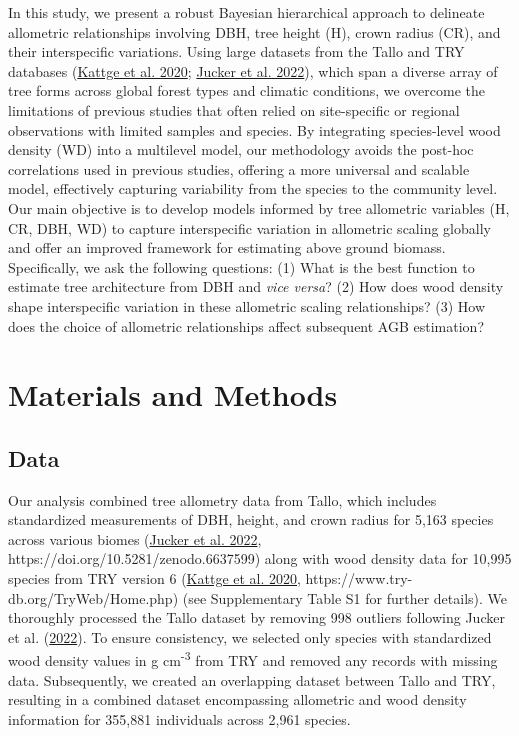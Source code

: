 \documentclass[
  12pt,
  letterpaper,
  DIV=11,
  numbers=noendperiod]{scrartcl}
\begin{document}
In this study, we present a robust Bayesian hierarchical approach to
delineate allometric relationships involving DBH, tree height (H), crown
radius (CR), and their interspecific variations. Using large datasets
from the Tallo and TRY databases
(\protect\hyperlink{ref-Kattge2020}{Kattge et al. 2020};
\protect\hyperlink{ref-Jucker2022}{Jucker et al. 2022}), which span a
diverse array of tree forms across global forest types and climatic
conditions, we overcome the limitations of previous studies that often
relied on site-specific or regional observations with limited samples
and species. By integrating species-level wood density (WD) into a
multilevel model, our methodology avoids the post-hoc correlations used
in previous studies, offering a more universal and scalable model,
effectively capturing variability from the species to the community
level. Our main objective is to develop models informed by tree
allometric variables (H, CR, DBH, WD) to capture interspecific variation
in allometric scaling globally and offer an improved framework for
estimating above ground biomass. Specifically, we ask the following
questions: (1) What is the best function to estimate tree architecture
from DBH and \emph{vice versa}? (2) How does wood density shape
interspecific variation in these allometric scaling relationships? (3)
How does the choice of allometric relationships affect subsequent AGB
estimation?

\hypertarget{materials-and-methods}{%
\section{Materials and Methods}\label{materials-and-methods}}

\hypertarget{data}{%
\subsection{Data}\label{data}}

Our analysis combined tree allometry data from Tallo, which includes
standardized measurements of DBH, height, and crown radius for 5,163
species across various biomes (\protect\hyperlink{ref-Jucker2022}{Jucker
et al. 2022}, https://doi.org/10.5281/zenodo.6637599) along with wood
density data for 10,995 species from TRY version 6
(\protect\hyperlink{ref-Kattge2020}{Kattge et al. 2020},
https://www.try-db.org/TryWeb/Home.php) (see Supplementary Table S1 for
further details). We thoroughly processed the Tallo dataset by removing
998 outliers following Jucker et al.
(\protect\hyperlink{ref-Jucker2022}{2022}). To ensure consistency, we
selected only species with standardized wood density values in g
cm\textsuperscript{-3} from TRY and removed any records with missing
data. Subsequently, we created an overlapping dataset between Tallo and
TRY, resulting in a combined dataset encompassing allometric and wood
density information for 355,881 individuals across 2,961 species.
\end{document}
